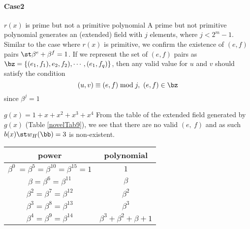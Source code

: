 \paragraph{Case2}$r(x)$ is prime but not a primitive polynomial\newline
A prime but not primitive polynomial generates an (extended) field with $j$ elements, where $j<2^m-1$. Similar to the case where $r(x)$ is primitive, we confirm the existence of $(e,f)$ pairs $ \st \beta^e + \beta^f =1$. 
If we represent the set of $(e,f)$ pairs as 
$\bz=\{ (e_1,f_1) , e_2,f_2),\cdots,(e_1,f_q)\} $, then any valid value for $u$ and $v$ should satisfy the condition
$$(u,v) \equiv (e,f) \bmod j,~(e,f)\in \bz$$ since $\beta^{j}=1$

\begin{example}
$g(x)=1+x+x^2+x^3+x^4$ \newline
From the table of the extended field generated by $g(x)$ (Table \ref{novelTab9}), we see that there are no valid $(e,~f)$ and as such $b(x) \st w_H(\bb)=3$ is non-existent.


 \begin{table*}[h]
 \caption{Non-zero Elements of GF$(2^4)$ generated by $f(x)=1+x+x^2+x^3+x^4$}
\centering
 \begin{tabular}{c c} 
 \hline
 power & polynomial \\ [0.5ex] 
 \hline\hline
$\beta^0~=\beta^5=\beta^{10}=\beta^{15}=1$ & $1$\\
\hline
$\beta=\beta^6=\beta^{11}$ & $\beta$\\
\hline
$\beta^2=\beta^7=\beta^{12}$ &  $\beta^2$\\
\hline
$\beta^3=\beta^8=\beta^{13}$ &  $\beta^3$\\
\hline
$\beta^4=\beta^9=\beta^{14}$ &  $\beta^3+\beta^2+\beta+1$\\
 \end{tabular}
 \label{novelTab9}
\end{table*}

\end{example}


